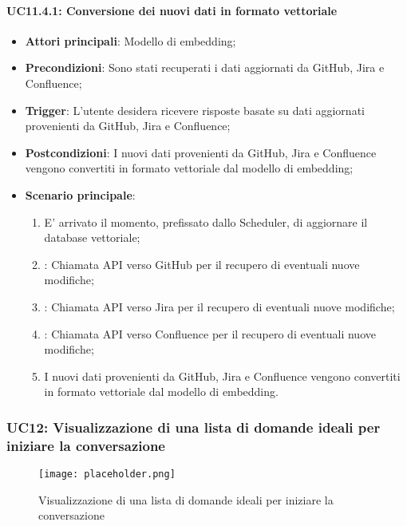 \paragraph{UC11.4.1: Conversione dei nuovi dati in formato vettoriale}
\begin{itemize}
    \item \textbf{Attori principali}: Modello di embedding;
    \item \textbf{Precondizioni}: Sono stati recuperati i dati aggiornati da GitHub, Jira e Confluence;
    \item \textbf{Trigger}: L'utente desidera ricevere risposte basate su dati aggiornati provenienti da GitHub, Jira e Confluence;
    \item \textbf{Postcondizioni}: I nuovi dati provenienti da GitHub, Jira e Confluence vengono convertiti in formato vettoriale dal modello di embedding;
    \item \textbf{Scenario principale}: 
    \begin{enumerate}
        \item E' arrivato il momento, prefissato dallo Scheduler, di aggiornare il database vettoriale;
        \item {}: Chiamata API verso GitHub per il recupero di eventuali nuove modifiche;
        \item {}: Chiamata API verso Jira per il recupero di eventuali nuove modifiche;
        \item {}: Chiamata API verso Confluence per il recupero di eventuali nuove modifiche;
        \item I nuovi dati provenienti da GitHub, Jira e Confluence vengono convertiti in formato vettoriale dal modello di embedding.
    \end{enumerate}
\end{itemize}


\hypertarget{UC12}{}
\subsubsection{UC12: Visualizzazione di una lista di domande ideali per iniziare la conversazione}

\begin{figure}[h]
    \centering
    \texttt{[image: placeholder.png]}
    \caption{Visualizzazione di una lista di domande ideali per iniziare la conversazione}
\end{figure}

